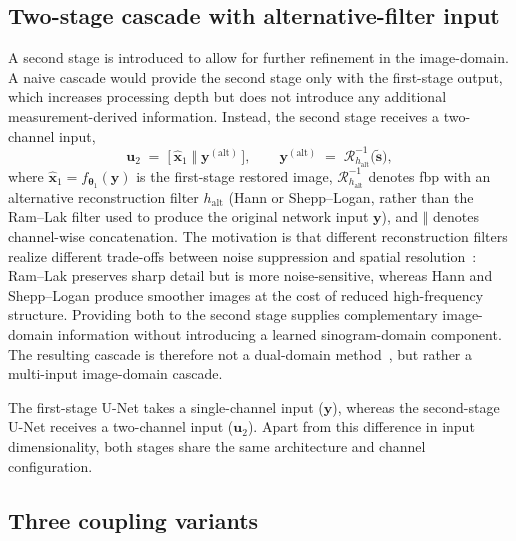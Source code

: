 \subsection{Two-stage cascade with alternative-filter input}
\label{subsec:meth_cascade_input}

A second stage is introduced to allow for further refinement in the image-domain. A naive cascade would provide the second stage only with the first-stage output, which increases processing depth but does not introduce any additional measurement-derived information. Instead, the second stage receives a two-channel input,
\begin{equation}
    \mathbf{u}_2 \;=\; \bigl[\,\hat{\mathbf{x}}_1\;\Vert\;\mathbf{y}^{(\mathrm{alt})}\,\bigr],
    \qquad
    \mathbf{y}^{(\mathrm{alt})} \;=\; \mathcal{R}^{-1}_{h_\mathrm{alt}}\!\bigl(\tilde{\mathbf{s}}\bigr),
    \label{eq:meth_alt_input}
\end{equation}
where $\hat{\mathbf{x}}_1 = f_{\boldsymbol{\theta}_1}(\mathbf{y})$ is the first-stage restored image, $\mathcal{R}^{-1}_{h_\mathrm{alt}}$ denotes \gls{fbp} with an alternative reconstruction filter $h_\mathrm{alt}$ (Hann or Shepp--Logan, rather than the Ram--Lak filter used to produce the original network input $\mathbf{y}$), and $\Vert$ denotes channel-wise concatenation. The motivation is that different reconstruction filters realize different trade-offs between noise suppression and spatial resolution~\cite{KakSlaney1988}: Ram--Lak preserves sharp detail but is more noise-sensitive, whereas Hann and Shepp--Logan produce smoother images at the cost of reduced high-frequency structure. Providing both to the second stage supplies complementary image-domain information without introducing a learned sinogram-domain component. The resulting cascade is therefore not a dual-domain method~\cite{Wang2020, Zhang2022}, but rather a multi-input image-domain cascade.

The first-stage U-Net takes a single-channel input ($\mathbf{y}$), whereas the second-stage U-Net receives a two-channel input ($\mathbf{u}_2$). Apart from this difference in input dimensionality, both stages share the same architecture and channel configuration.
\subsection{Three coupling variants}
\label{subsec:meth_cascade_variants}

